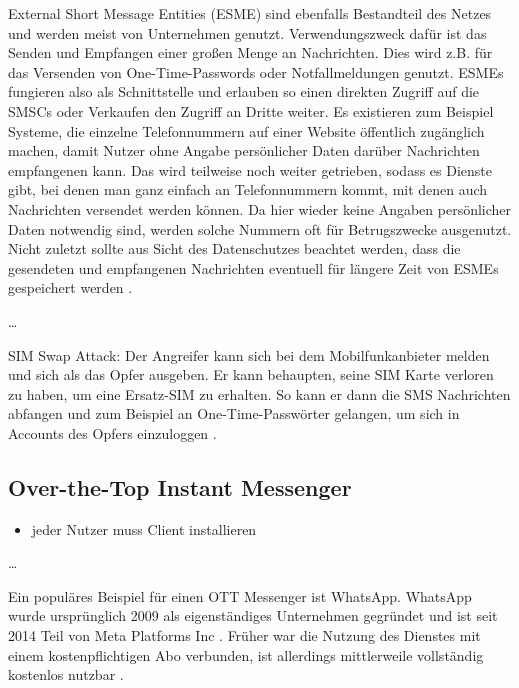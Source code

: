 \documentclass[conference]{IEEEtran}
\begin{document}
External Short Message Entities (ESME) sind ebenfalls Bestandteil des Netzes und werden meist von Unternehmen genutzt.
Verwendungszweck dafür ist das Senden und Empfangen einer großen Menge an Nachrichten.
Dies wird z.B. für das Versenden von One-Time-Passwords oder Notfallmeldungen genutzt.
ESMEs fungieren also als Schnittstelle und erlauben so einen direkten Zugriff auf die SMSCs oder Verkaufen den Zugriff an Dritte weiter.
Es existieren zum Beispiel Systeme, die einzelne Telefonnummern auf einer Website öffentlich zugänglich machen, damit Nutzer ohne Angabe persönlicher Daten darüber Nachrichten empfangenen kann.
Das wird teilweise noch weiter getrieben, sodass es Dienste gibt, bei denen man ganz einfach an Telefonnummern kommt, mit denen auch Nachrichten versendet werden können.
Da hier wieder keine Angaben persönlicher Daten notwendig sind, werden solche Nummern oft für Betrugszwecke ausgenutzt.
Nicht zuletzt sollte aus Sicht des Datenschutzes beachtet werden, dass die gesendeten und empfangenen Nachrichten eventuell für längere Zeit von ESMEs gespeichert werden \cite{sendoutsms}.

\dots

SIM Swap Attack:
Der Angreifer kann sich bei dem Mobilfunkanbieter melden und sich als das Opfer ausgeben.
Er kann behaupten, seine SIM Karte verloren zu haben, um eine Ersatz-SIM zu erhalten.
So kann er dann die SMS Nachrichten abfangen und zum Beispiel an One-Time-Passwörter gelangen, um sich in Accounts des Opfers einzuloggen \cite{sendoutsms}.


\subsection{Over-the-Top Instant Messenger}

\begin{itemize}
    \item jeder Nutzer muss Client installieren
\end{itemize}
\cite{rcsmno}

\dots

Ein populäres Beispiel für einen OTT Messenger ist WhatsApp.
WhatsApp wurde ursprünglich 2009 als eigenständiges Unternehmen gegründet und ist seit 2014 Teil von Meta Platforms Inc \cite{watimeline}.
Früher war die Nutzung des Dienstes mit einem kostenpflichtigen Abo verbunden, ist allerdings mittlerweile vollständig kostenlos nutzbar \cite{wakostenlos}.
\end{document}

